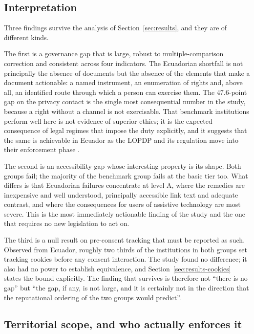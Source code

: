 \documentclass[pdflatex,sn-basic,Numbered,iicol]{sn-jnl}
\theoremstyle{thmstyleone}
\theoremstyle{thmstyletwo}
\theoremstyle{thmstylethree}
\begin{document}
	\subsection{Interpretation}\label{sec:discussion-interp}
	
	Three findings survive the analysis of Section~\ref{sec:results}, and they are of different kinds.
	
	The first is a governance gap that is large, robust to multiple-comparison correction and consistent across four indicators. The Ecuadorian shortfall is not principally the absence of documents but the absence of the elements that make a document actionable: a named instrument, an enumeration of rights and, above all, an identified route through which a person can exercise them. The 47.6-point gap on the privacy contact is the single most consequential number in the study, because a right without a channel is not exercisable. That benchmark institutions perform well here is not evidence of superior ethics; it is the expected consequence of legal regimes that impose the duty explicitly, and it suggests that the same is achievable in Ecuador as the LOPDP and its regulation move into their enforcement phase \citep{lopdp2021,reglamentolopdp2023}.
	
	The second is an accessibility gap whose interesting property is its shape. Both groups fail; the majority of the benchmark group fails at the basic tier too. What differs is that Ecuadorian failures concentrate at level A, where the remedies are inexpensive and well understood, principally accessible link text and adequate contrast, and where the consequences for users of assistive technology are most severe. This is the most immediately actionable finding of the study and the one that requires no new legislation to act on.
	
	The third is a null result on pre-consent tracking that must be reported as such. Observed from Ecuador, roughly two thirds of the institutions in both groups set tracking cookies before any consent interaction. The study found no difference; it also had no power to establish equivalence, and Section~\ref{sec:results-cookies} states the bound explicitly. The finding that survives is therefore not ``there is no gap'' but ``the gap, if any, is not large, and it is certainly not in the direction that the reputational ordering of the two groups would predict''.
	
	\subsection{Territorial scope, and who actually enforces it}\label{sec:discussion-legal}
	
\end{document}
